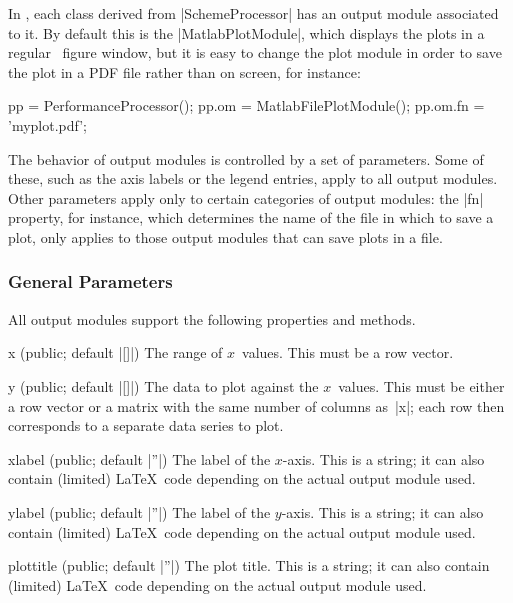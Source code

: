 In \jscsim, each class derived from |SchemeProcessor| has an output module
associated to it. By default this is the |MatlabPlotModule|, which displays the
plots in a regular \matlab\ figure window, but it is easy to change the plot
module in order to save the plot in a PDF file rather than on screen, for
instance:
\begin{Code}
  pp = PerformanceProcessor();
  pp.om = MatlabFilePlotModule();
  pp.om.fn = 'myplot.pdf';
\end{Code}

The behavior of output modules is controlled by a set of parameters. Some of
these, such as the axis labels or the legend entries, apply to all
output modules. Other parameters apply only to certain categories of output
modules: the |fn| property, for instance, which determines the name of the file
in which to save a plot, only applies to those output modules that can save
plots in a file. 


\subsubsection{General Parameters}

All output modules support the following properties and methods.
\begin{property}{x (public; default |[]|)}
  The range of $x$~values. This must be a row vector.
\end{property}
\begin{property}{y (public; default |[]|)}
  The data to plot against the $x$~values. This must be either
  a row vector or a matrix with the same number of columns as~|x|; each
  row then corresponds to a separate data series to plot.
\end{property}

\begin{property}{xlabel (public; default |''|)}
  The label of the $x$-axis. This is a string; it can
  also contain (limited) \LaTeX\ code depending on the actual output module
  used. 
\end{property}
\begin{property}{ylabel (public; default |''|)}
  The label of the $y$-axis. This is a string; it can
  also contain (limited) \LaTeX\ code depending on the actual output module
  used.
\end{property}

\begin{property}{plottitle (public; default |''|)}
  The plot title. This is a string; it can also
  contain (limited) \LaTeX\ code depending on the actual output module used.
\end{property}

